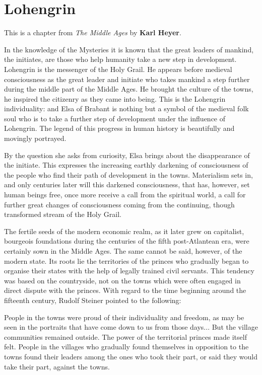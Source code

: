 \section{Lohengrin}

\begin{quotex}
This is a chapter from \textit{The Middle Ages} by \textbf{Karl Heyer}.
\end{quotex}


In the knowledge of the Mysteries it is known that the great leaders of mankind, the initiates, are those who help humanity take a new step in development. Lohengrin is the messenger of the Holy Grail. He appears before medieval consciousness as the great leader and initiate who takes mankind a step further during the middle part of the Middle Ages. He brought the culture of the towns, he inspired the citizenry as they came into being. This is the Lohengrin individuality: and Elsa of Brabant is nothing but a symbol of the medieval folk soul who is to take a further step of development under the influence of Lohengrin. The legend of this progress in human history is beautifully and movingly portrayed.

By the question she asks from curiosity, Elsa brings about the disappearance of the initiate. This expresses the increasing earthly darkening of consciousness of the people who find their path of development in the towns. Materialism sets in, and only centuries later will this darkened consciousness, that has, however, set human beings free, once more receive a call from the spiritual world, a call for further great changes of consciousness coming from the continuing, though transformed stream of the Holy Grail.

The fertile seeds of the modern economic realm, as it later grew on capitalist, bourgeois foundations during the centuries of the fifth post-Atlantean era, were certainly sown in the Middle Ages. The same cannot be said, however, of the modern state. Its roots lie the territories of the princes who gradually began to organise their states with the help of legally trained civil servants. This tendency was based on the countryside, not on the towns which were often engaged in direct dispute with the princes. With regard to the time beginning around the fifteenth century, Rudolf Steiner pointed to the following:

\begin{quotex}
People in the towns were proud of their individuality and freedom, as may be seen in the portraits that have come down to us from those days... But the village communities remained outside. The power of the territorial princes made itself felt. People in the villages who gradually found themselves in opposition to the towns found their leaders among the ones who took their part, or said they would take their part, against the towns.
\end{quotex}


